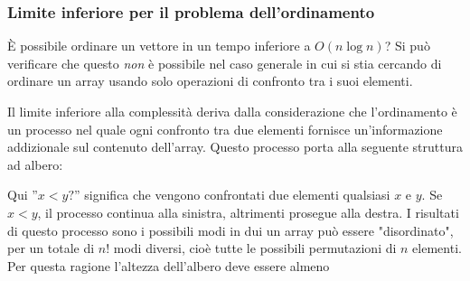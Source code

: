 \subsubsection{Limite inferiore per il problema dell'ordinamento}

È possibile ordinare un vettore in un tempo 
inferiore a $O(n \log n)$?
Si può verificare che questo \emph{non} è possibile
nel caso generale in cui si stia cercando di ordinare 
un array usando solo operazioni di confronto tra i
suoi elementi.

Il limite inferiore alla complessità
deriva dalla considerazione che l'ordinamento
è un processo nel quale ogni confronto tra due elementi
fornisce un'informazione addizionale sul contenuto dell'array.
Questo processo porta alla seguente struttura ad albero:

\begin{center}
\end{center}

Qui ''$x<y?$'' significa che vengono confrontati 
due elementi qualsiasi $x$ e $y$.
Se $x<y$, il processo continua alla sinistra, 
altrimenti prosegue alla destra.
I risultati di questo processo sono i possibili
modi in dui un array può essere "disordinato", per un totale di $n!$ modi diversi,
cioè tutte le possibili permutazioni di $n$ elementi.
Per questa ragione l'altezza dell'albero 
deve essere almeno

